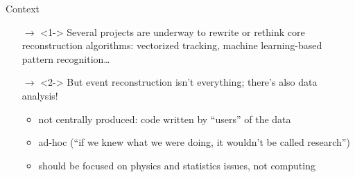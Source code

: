 \documentclass[aspectratio=169]{beamer}
\begin{document}
\begin{frame}{Context}
\vspace{0.75 cm}
\begin{itemize}\setlength{\itemsep}{0.75 cm}
\item[$\rightarrow$]<1-> Several projects are underway to rewrite or rethink core reconstruction algorithms: vectorized tracking, machine learning-based pattern recognition\ldots

\item[$\rightarrow$]<2-> But event reconstruction isn't everything; there's also data analysis!

\vspace{0.1 cm}
\begin{itemize}\setlength{\itemsep}{0.15 cm}
\item<3-> not centrally produced: code written by ``users'' of the data
\item<4-> ad-hoc (``if we knew what we were doing, it wouldn't be called research'')
\item<5-> should be focused on physics and statistics issues, not computing
\end{itemize}
\end{itemize}
\end{frame}
\end{document}
